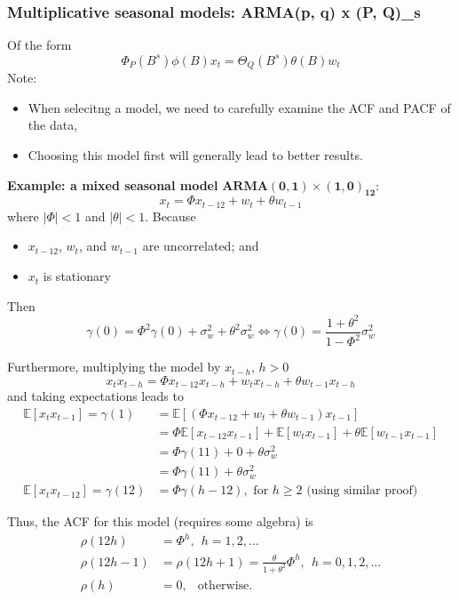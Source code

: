 \documentclass[11pt]{article}
\newcommand{\noi}{\noindent}
\begin{document}


\subsubsection{Multiplicative seasonal models: ARMA(p, q) x (P, Q)_s}
\noi Of the form
$$\Phi_P(B^s)\phi(B)x_t = \Theta_Q(B^s)\theta(B)w_t$$
\noi Note:
\begin{itemize}
    \item When selecitng a model, we need to carefully examine the ACF and PACF of the data,
    \item Choosing this model first will generally lead to better results.
\end{itemize} \phantom{i}

\noi \textbf{Example: a mixed seasonal model} $\boldsymbol{ARMA(0, 1) \times (1, 0)_{12}}$:
$$x_t = \Phi x_{t-12} + w_t + \theta w_{t-1}$$
\noi where $|\Phi| < 1$ and $|\theta| < 1$. Because
\begin{itemize}
    \item $x_{t-12}$, $w_t$, and $w_{t-1}$ are uncorrelated; and
    \item $x_t$ is stationary
\end{itemize} \phantom{i}

\noi Then
$$\gamma(0) = \Phi^2\gamma(0) + \sigma_w^2 + \theta^2\sigma_w^2 \Leftrightarrow \gamma(0) = \frac{1 + \theta^2}{1 - \Phi^2}\sigma_w^2$$

\noi Furthermore, multiplying the model by $x_{t-h}$, $h > 0$
$$x_t x_{t-h} = \Phi x_{t-12}x_{t-h} + w_tx_{t-h} + \theta w_{t-1}x_{t-h}$$
\noi and taking expectations leads to
\begin{align*}
    \mathbb{E}[x_tx_{t-1}] = \gamma(1) &= \mathbb{E}[(\Phi x_{t-12} + w_{t} + \theta w_{t-1})x_{t-1}] \\
    &= \Phi \mathbb{E}[x_{t-12}x_{t-1}] + \mathbb{E}[w_t x_{t-1}] + \theta \mathbb{E}[w_{t-1}x_{t-1}] \\
    &= \Phi\gamma(11) + 0 + \theta\sigma_w^2 \\
    &= \Phi\gamma(11) + \theta \sigma_w^2 \\
    \mathbb{E}[x_t x_{t-12}] = \gamma(12) &= \Phi \gamma(h-12), \text{ for } h \geq 2 \text{ (using similar proof)}
\end{align*}

\noi Thus, the ACF for this model (requires some algebra) is
\begin{align*}
    \rho(12h) &= \Phi^h, \: \: h=1,2,... \\
    \rho(12h-1) &= \rho(12h+1) = \frac{\theta}{1 + \theta^2}\Phi^h, \: \: h=0,1,2,... \\
    \rho(h) &= 0, \: \: \text{ otherwise}.
\end{align*}
\end{document}
